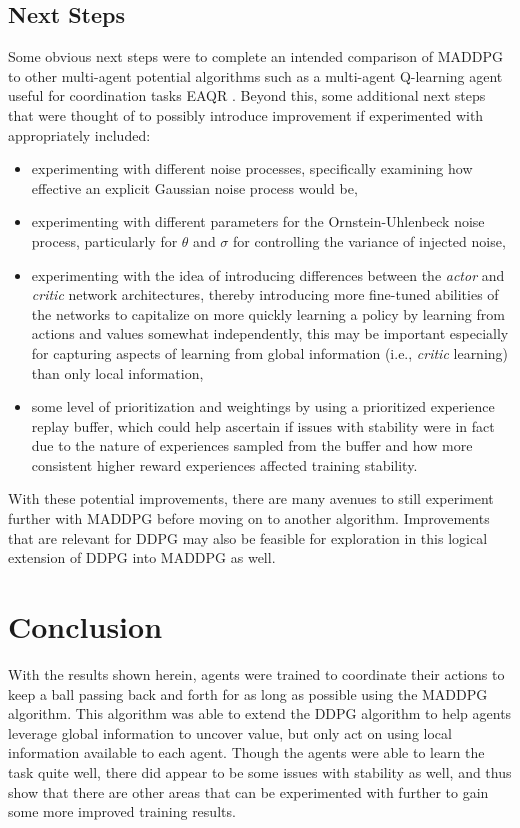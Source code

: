 \documentclass[11pt]{article}
\begin{document}
	\subsection{Next Steps}
	
	Some obvious next steps were to complete an intended comparison of MADDPG to other multi-agent potential algorithms such as a multi-agent Q-learning agent useful for coordination tasks EAQR \cite{eaqr}. Beyond this, some additional next steps that were thought of to possibly introduce improvement if experimented with appropriately included:
	\begin{itemize}
		\item experimenting with different noise processes, specifically examining how effective an explicit Gaussian noise process would be,
		\item experimenting with different parameters for the Ornstein-Uhlenbeck noise process, particularly for $\theta$ and $\sigma$ for controlling the variance of injected noise,
		\item experimenting with the idea of introducing differences between the \textit{actor} and \textit{critic} network architectures, thereby introducing more fine-tuned abilities of the networks to capitalize on more quickly learning a policy by learning from actions and values somewhat independently, this may be important especially for capturing aspects of learning from global information (i.e., \textit{critic} learning) than only local information,
		\item some level of prioritization and weightings by using a prioritized experience replay buffer, which could help ascertain if issues with stability were in fact due to the nature of experiences sampled from the buffer and how more consistent higher reward experiences affected training stability.
	\end{itemize}
	
	With these potential improvements, there are many avenues to still experiment further with MADDPG before moving on to another algorithm. Improvements that are relevant for DDPG may also be feasible for exploration in this logical extension of DDPG into MADDPG as well.
	
	\section{Conclusion}
	
	With the results shown herein, agents were trained to coordinate their actions to keep a ball passing back and forth for as long as possible using the MADDPG algorithm. This algorithm was able to extend the DDPG algorithm to help agents leverage global information to uncover value, but only act on using local information available to each agent. Though the agents were able to learn the task quite well, there did appear to be some issues with stability as well, and thus show that there are other areas that can be experimented with further to gain some more improved training results.
	
\end{document}
